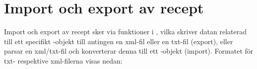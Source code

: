 \section{Import och export av recept}
Import och export av recept sker via funktioner i \Shell, vilka skriver datan relaterad till ett specifikt \Recipe-objekt till antingen en xml-fil eller en txt-fil (export),
 eller parsar en xml/txt-fil och konverterar denna till ett \Recipe-objekt (import). Formatet för txt- respektive xml-filerna visas nedan:

\begin{framed}

\end{framed}

\begin{framed}

\end{framed}

\begin{framed}

\end{framed}
